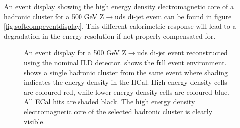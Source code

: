 

An event display showing the high energy density electromagnetic core of a hadronic cluster for a 500 GeV Z$\rightarrow$uds di-jet event can be found in figure \ref{fig:softcompeventdisplay}.  This different calorimetric response will lead to a degradation in the energy resolution if not properly compensated for.  

\begin{figure}
\caption[An event display for a 500 GeV Z$\rightarrow$uds di-jet event reconstructed using the nominal ILD detector.  \protect{} shows the full event environment.  \protect{} shows a single hadronic cluster from the same event where shading indicates the energy density in the HCal.  High energy density cells are coloured red, while lower energy density cells are coloured blue.  All ECal \text{ } hits are shaded black.  The high energy density electromagnetic core of the selected hadronic cluster is clearly visible.]{An event display for a 500 GeV Z$\rightarrow$uds di-jet event reconstructed using the nominal ILD detector.  \protect{} shows the full event environment.  \protect{} shows a single hadronic cluster from the same event where shading indicates the energy density in the HCal.  High energy density cells are coloured red, while lower energy density cells are coloured blue.  All ECal \text{ } hits are shaded black.  The high energy density electromagnetic core of the selected hadronic cluster is clearly visible.}

\end{figure}
